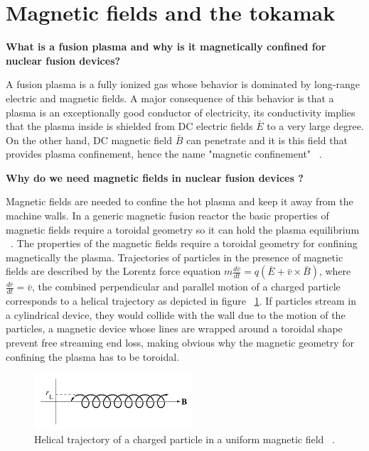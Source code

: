 \section{Magnetic fields and the tokamak}

\textbf{What is a fusion plasma and why is it magnetically confined for nuclear fusion devices?}

A fusion plasma is a fully ionized gas whose behavior is dominated by long-range electric and magnetic fields. A major consequence of this behavior is that a plasma is an exceptionally good conductor of electricity, its conductivity implies that the plasma inside is shielded from DC electric fields $\bar{E}$ to a very large degree. On the other hand, DC magnetic field $\bar{B}$ can penetrate and it is this field that provides plasma confinement, hence the name "magnetic confinement" ~\cite[Chapter~6]{Freidberg2007}.\smallskip

\textbf{Why do we need magnetic fields in nuclear fusion devices ?}
\smallskip

Magnetic fields are needed to confine the hot plasma and keep it away from the machine walls.  In a generic magnetic fusion reactor the basic properties of magnetic fields require  a toroidal geometry so it can hold the plasma equilibrium ~\cite[Chapter~4]{Freidberg2007}. The properties of the magnetic fields require a toroidal geometry for confining magnetically the plasma. Trajectories of particles in the presence of magnetic fields are described by the Lorentz force equation $m \frac{d\bar{v}}{dt}=q(\bar{E}+\bar{v}\times \bar{B})$, where $\frac{d\bar{r}}{dt}=\bar{v}$, the combined perpendicular and parallel motion of a charged particle corresponds to a helical trajectory as  depicted in figure ~\ref{Helical}. If particles stream in a cylindrical device, they would collide with the wall due to the motion of the particles, a magnetic device whose lines are wrapped around  a toroidal shape  prevent free streaming end loss, making obvious why the magnetic geometry for confining the plasma has to be toroidal.\smallskip

\begin{figure}
	\centering
	\includegraphics[width=0.525\textwidth]{Chp1/Helical_tray.png}
	\caption{  Helical trajectory of a charged particle in a uniform magnetic field ~\cite[Chapter~8]{Freidberg2007}.\label{Helical}}
\end{figure}

